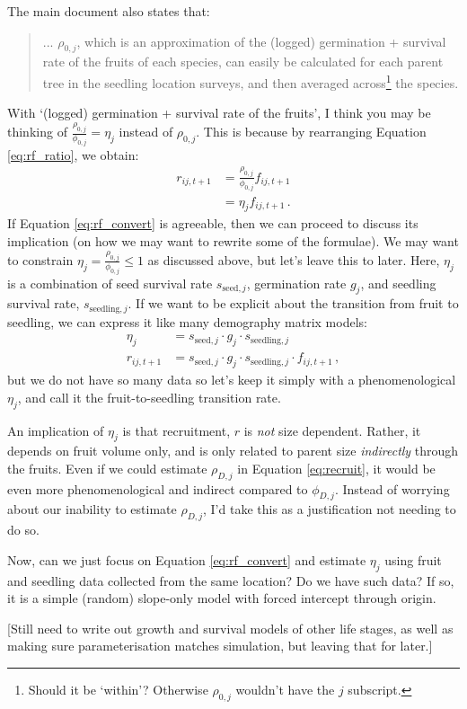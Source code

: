 \documentclass[12pt,a4paper]{article}
\begin{document}
The main document also states that:
\begin{quote}
... $\rho_{0,j}$, which is an approximation of the (logged) germination + survival rate of the fruits of each species, can easily be calculated for each parent tree in the seedling location surveys, and then averaged across\footnote{Should it be `within'? Otherwise $\rho_{0,j}$ wouldn't have the $j$ subscript.} the species.
\end{quote}
With `(logged) germination + survival rate of the fruits', I think you may be thinking of $\frac{\rho_{0,j}}{\phi_{0,j}} = \eta_j$ instead of $\rho_{0,j}$. This is because by rearranging Equation \ref{eq:rf_ratio}, we obtain:
\begin{align}
r_{ij,t+1} &= \frac{\rho_{0,j}}{\phi_{0,j}} f_{ij,t+1} \\
&= \eta_j f_{ij,t+1} \label{eq:rf_convert} \,.
\end{align}
If Equation \ref{eq:rf_convert} is agreeable, then we can proceed to discuss its implication (on how we may want to rewrite some of the formulae). We may want to constrain $\eta_j = \frac{\rho_{0,j}}{\phi_{0,j}} \le 1$ as discussed above, but let's leave this to later. Here, $\eta_j$ is a combination of seed survival rate $s_{\text{seed},j}$, germination rate $g_{j}$, and seedling survival rate, $s_{\text{seedling},j}$. If we want to be explicit about the transition from fruit to seedling, we can express it like many demography matrix models:
\begin{align*}
\eta_j &= s_{\text{seed},j} \cdot g_{j} \cdot s_{\text{seedling},j} \\
r_{ij,t+1} &= s_{\text{seed},j} \cdot g_{j} \cdot s_{\text{seedling},j} \cdot f_{ij,t+1} \,,
\end{align*}
but we do not have so many data so let's keep it simply with a phenomenological $\eta_j$, and call it the fruit-to-seedling transition rate.

An implication of $\eta_j$ is that recruitment, $r$ is \textit{not} size dependent. Rather, it depends on fruit volume only, and is only related to parent size \textit{indirectly} through the fruits. Even if we could estimate $\rho_{D,j}$ in Equation \ref{eq:recruit}, it would be even more phenomenological and indirect compared to $\phi_{D,j}$. Instead of worrying about our inability to estimate $\rho_{D,j}$, I'd take this as a justification not needing to do so.

Now, can we just focus on Equation \ref{eq:rf_convert} and estimate $\eta_j$ using fruit and seedling data collected from the same location? Do we have such data? If so, it is a simple (random) slope-only model with forced intercept through origin.

[Still need to write out growth and survival models of other life stages, as well as making sure parameterisation matches simulation, but leaving that for later.]
\end{document}
